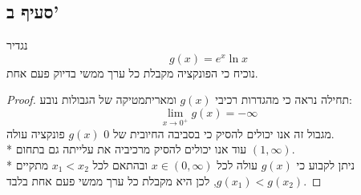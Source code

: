 \subsection{סעיף ב'}
נגדיר
\[
	g(x) = e^x \ln x
\]
נוכיח כי הפונקציה מקבלת כל ערך ממשי בדיוק פעם אחת.
\begin{proof}
	תחילה נראה כי מהגדרות רכיבי $g(x)$ ומאריתמטיקה של הגבולות נובע:
	\[
		\lim_{x \to 0^+} g(x) = -\infty
	\]
	מגבול זה אנו יכולים להסיק כי בסביבה החיובית של $0$ $g(x)$ פונקציה עולה. \\*
	עוד אנו יכולים להסיק מרכיביה את עלייתה גם בתחום $(1, \infty)$. \\*
	ניתן לקבוע כי $g(x)$ עולה לכל $x \in (0, \infty)$ ובהתאם לכל $x_1 < x_2$ מתקיים $g(x_1) < g(x_2)$,
	לכן היא מקבלת כל ערך ממשי פעם אחת בלבד.
\end{proof}

